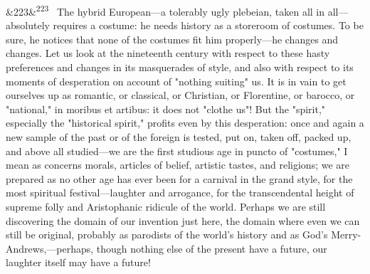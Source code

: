 \documentclass[12pt]{article}
\newcommand{\para}[1][]{\par\noindent\ifx&#1&\else\textsuperscript{\footnotesize #1}~\fi}
\begin{document}
\para[223] The hybrid European---a tolerably ugly plebeian, taken all in all---absolutely requires a costume: he needs history as a storeroom of costumes. To be sure, he notices that none of the costumes fit him properly---he changes and changes. Let us look at the nineteenth century with respect to these hasty preferences and changes in its masquerades of style, and also with respect to its moments of desperation on account of "nothing suiting" us. It is in vain to get ourselves up as romantic, or classical, or Christian, or Florentine, or barocco, or "national," in moribus et artibus: it does not "clothe us"! But the "spirit," especially the "historical spirit," profits even by this desperation: once and again a new sample of the past or of the foreign is tested, put on, taken off, packed up, and above all studied---we are the first studious age in puncto of "costumes," I mean as concerns morals, articles of belief, artistic tastes, and religions; we are prepared as no other age has ever been for a carnival in the grand style, for the most spiritual festival---laughter and arrogance, for the transcendental height of supreme folly and Aristophanic ridicule of the world. Perhaps we are still discovering the domain of our invention just here, the domain where even we can still be original, probably as parodists of the world's history and as God's Merry-Andrews,---perhaps, though nothing else of the present have a future, our laughter itself may have a future!
\end{document}
